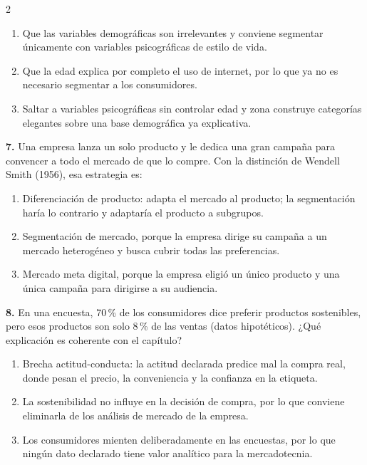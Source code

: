 \documentclass[10pt,letterpaper]{article}
\begin{document}
\begin{multicols}{2}
\begin{enumerate}[label=\alph*),leftmargin=1.1em,itemsep=0pt,topsep=1pt,parsep=0pt,partopsep=0pt]
\item Que las variables demográficas son irrelevantes y conviene segmentar únicamente con variables psicográficas de estilo de vida.
\item Que la edad explica por completo el uso de internet, por lo que ya no es necesario segmentar a los consumidores.
\item Saltar a variables psicográficas sin controlar edad y zona construye categorías elegantes sobre una base demográfica ya explicativa.
\end{enumerate}
\vspace{2pt}
\noindent\textbf{7.} Una empresa lanza un solo producto y le dedica una gran campaña para convencer a todo el mercado de que lo compre. Con la distinción de Wendell Smith (1956), esa estrategia es:
\vspace{-3pt}
\begin{enumerate}[label=\alph*),leftmargin=1.1em,itemsep=0pt,topsep=1pt,parsep=0pt,partopsep=0pt]
\item Diferenciación de producto: adapta el mercado al producto; la segmentación haría lo contrario y adaptaría el producto a subgrupos.
\item Segmentación de mercado, porque la empresa dirige su campaña a un mercado heterogéneo y busca cubrir todas las preferencias.
\item Mercado meta digital, porque la empresa eligió un único producto y una única campaña para dirigirse a su audiencia.
\end{enumerate}
\vspace{2pt}
\noindent\textbf{8.} En una encuesta, 70\,\% de los consumidores dice preferir productos sostenibles, pero esos productos son solo 8\,\% de las ventas (datos hipotéticos). ¿Qué explicación es coherente con el capítulo?
\vspace{-3pt}
\begin{enumerate}[label=\alph*),leftmargin=1.1em,itemsep=0pt,topsep=1pt,parsep=0pt,partopsep=0pt]
\item Brecha actitud-conducta: la actitud declarada predice mal la compra real, donde pesan el precio, la conveniencia y la confianza en la etiqueta.
\item La sostenibilidad no influye en la decisión de compra, por lo que conviene eliminarla de los análisis de mercado de la empresa.
\item Los consumidores mienten deliberadamente en las encuestas, por lo que ningún dato declarado tiene valor analítico para la mercadotecnia.
\end{enumerate}

\end{multicols}
\end{document}
